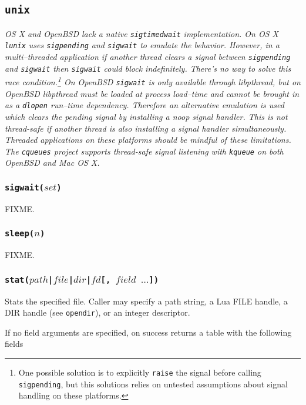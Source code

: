 \documentclass[11pt, oneside]{memoir}
\newcommand*{\lunix}[0]{\texttt{lunix}\xspace}
\newcommand*{\cqueues}[0]{\texttt{cqueues}\xspace}
\newcommand*{\syscall}[1]{\texttt{#1}\xspace}
\newcommand*{\fn}[1]{\texttt{#1}\xspace}
\newcounter{toccols}
\newenvironment{Module}[1]{
	\subsection{\texttt{#1}}
	\addtocontents{toc}{
		\protect\begin{multicols}{\value{toccols}}
	}
}{
	\addtocontents{toc}{\protect\end{multicols}}
}
\begin{document}
\begin{Module}{unix}
\emph{OS X and OpenBSD lack a native \syscall{sigtimedwait} implementation. On OS X \lunix uses \syscall{sigpending} and \syscall{sigwait} to emulate the behavior. However, in a multi--threaded application if another thread clears a signal between \syscall{sigpending} and \syscall{sigwait} then \syscall{sigwait} could block indefinitely. There's no way to solve this race condition.\footnote{One possible solution is to explicitly \syscall{raise} the signal before calling \syscall{sigpending}, but this solutions relies on untested assumptions about signal handling on these platforms.} On OpenBSD \syscall{sigwait} is only available through libpthread, but on OpenBSD libpthread must be loaded at process load--time and cannot be brought in as a \syscall{dlopen} run--time dependency. Therefore an alternative emulation is used which clears the pending signal by installing a noop signal handler. This is not thread-safe if another thread is also installing a signal handler simultaneously. Threaded applications on these platforms should be mindful of these limitations. The \cqueues project supports thread-safe signal listening with \syscall{kqueue} on both OpenBSD and Mac OS X.}

\subsubsection[\fn{sigwait}]{\fn{sigwait($set$)}}

FIXME.

\subsubsection[\fn{sleep}]{\fn{sleep($n$)}}

FIXME.

\subsubsection[\fn{stat}]{\fn{stat($path$|$file$|$dir$|$fd$[, $field$ $\ldots$])}}

Stats the specified file. Caller may specify a path string, a Lua FILE handle, a DIR handle (see \fn{opendir}), or an integer descriptor.

If no field arguments are specified, on success returns a table with the following fields


\end{Module}
\end{document}
